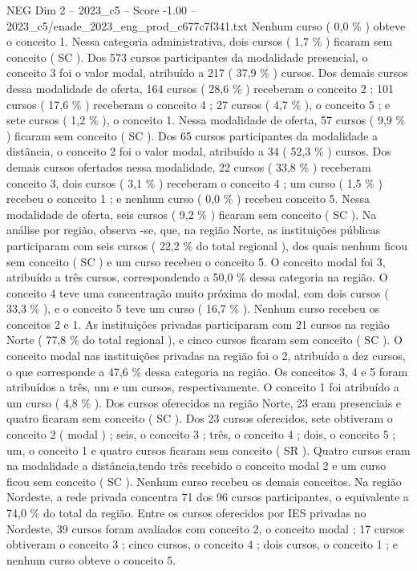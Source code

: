 \begin{textsample}{NEG Dim 2 – 2023\_c5 – Score -1.00 – 2023\_c5/enade\_2023\_eng\_prod\_c677c7f341.txt}
Nenhum curso ( 0,0 \% ) obteve o conceito 1.
Nessa categoria administrativa, dois cursos ( 1,7 \% ) ficaram sem conceito ( SC ).
Dos 573 cursos participantes da modalidade presencial, o conceito 3 foi o valor modal, atribuído a 217 ( 37,9 \% ) cursos.
Dos demais cursos dessa modalidade de oferta, 164 cursos ( 28,6 \% ) receberam o conceito 2 ; 101 cursos ( 17,6 \% ) receberam o conceito 4 ; 27 cursos ( 4,7 \% ), o conceito 5 ; e sete cursos ( 1,2 \% ), o conceito 1.
Nessa modalidade de oferta, 57 cursos ( 9,9 \% ) ficaram sem conceito ( SC ).
Dos 65 cursos participantes da modalidade a distância, o conceito 2 foi o valor modal, atribuído a 34 ( 52,3 \% ) cursos.
Dos demais cursos ofertados nessa modalidade, 22 cursos ( 33,8 \% ) receberam conceito 3, dois cursos ( 3,1 \% ) receberam o conceito 4 ; um curso ( 1,5 \% ) recebeu o conceito 1 ; e nenhum curso ( 0,0 \% ) recebeu conceito 5.
Nessa modalidade de oferta, seis cursos ( 9,2 \% ) ficaram sem conceito ( SC ).
Na análise por região, observa -se, que, na região Norte, as instituições públicas participaram com seis cursos ( 22,2 \% do total regional ), dos quais nenhum ficou sem conceito ( SC ) e um curso recebeu o conceito 5.
O conceito modal foi 3, atribuído a três cursos, correspondendo a 50,0 \% dessa categoria na região.
O conceito 4 teve uma concentração muito próxima do modal, com dois cursos ( 33,3 \% ), e o conceito 5 teve um curso ( 16,7 \% ).
Nenhum curso recebeu os conceitos 2 e 1.
As instituições privadas participaram com 21 cursos na região Norte ( 77,8 \% do total regional ), e cinco cursos ficaram sem conceito ( SC ).
O conceito modal nas instituições privadas na região foi o 2, atribuído a dez cursos, o que corresponde a 47,6 \% dessa categoria na região.
Os conceitos 3, 4 e 5 foram atribuídos a três, um e um cursos, respectivamente.
O conceito 1 foi atribuído a um curso ( 4,8 \% ).
Dos cursos oferecidos na região Norte, 23 eram presenciais e quatro ficaram sem conceito ( SC ).
Dos 23 cursos oferecidos, sete obtiveram o conceito 2 ( modal ) ; seis, o conceito 3 ; três, o conceito 4 ; dois, o conceito 5 ; um, o conceito 1 e quatro cursos ficaram sem conceito ( SR ).
Quatro cursos eram na modalidade a distância,tendo três recebido o conceito modal 2 e um curso ficou sem conceito ( SC ).
Nenhum curso recebeu os demais conceitos.
Na região Nordeste, a rede privada concentra 71 dos 96 cursos participantes, o equivalente a 74,0 \% do total da região.
Entre os cursos oferecidos por IES privadas no Nordeste, 39 cursos foram avaliados com conceito 2, o conceito modal ; 17 cursos obtiveram o conceito 3 ; cinco cursos, o conceito 4 ; dois cursos, o conceito 1 ; e nenhum curso obteve o conceito 5.

\end{textsample}
